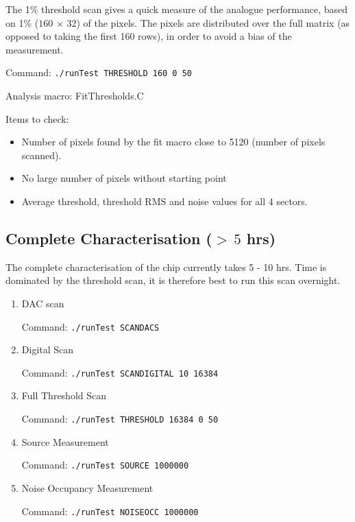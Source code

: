 \documentclass{article}
\begin{document}
\begin{enumerate}
{The 1\% threshold scan gives a quick measure of the analogue performance, based on 1\% ($160\,\times\,32$) of the pixels. The pixels are distributed over the full matrix (as opposed to taking the first 160 rows), in order to avoid a bias of the measurement.

Command: \texttt{./runTest THRESHOLD 160 0 50}

Analysis macro: FitThresholds.C

Items to check: 
\begin{itemize}
\item{Number of pixels found by the fit macro close to 5120 (number of pixels scanned).}
\item{No large number of pixels without starting point}
\item{Average threshold, threshold RMS and noise values for all 4 sectors.}
\end{itemize}
}
\end{enumerate}

\subsection{Complete Characterisation ($>\,5$ hrs)}

The complete characterisation of the chip currently takes 5 - 10 hrs. Time is dominated by the threshold scan, it is therefore best to run this scan overnight. 

\begin{enumerate}
\item{DAC scan}

Command: \texttt{./runTest SCANDACS}

\item{Digital Scan}

Command: \texttt{./runTest SCANDIGITAL 10 16384}

\item{Full Threshold Scan}

Command: \texttt{./runTest THRESHOLD 16384 0 50}

\item{Source Measurement}

Command: \texttt{./runTest SOURCE 1000000}

\item{Noise Occupancy Measurement}

Command: \texttt{./runTest NOISEOCC 1000000}

\end{enumerate}
\end{document}
